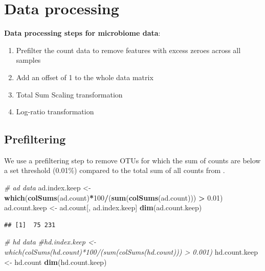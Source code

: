 \documentclass[]{book}
\newenvironment{Shaded}{\begin{snugshade}}{\end{snugshade}}
\newcommand{\KeywordTok}[1]{\textcolor[rgb]{0.13,0.29,0.53}{\textbf{#1}}}
\newcommand{\DecValTok}[1]{\textcolor[rgb]{0.00,0.00,0.81}{#1}}
\newcommand{\FloatTok}[1]{\textcolor[rgb]{0.00,0.00,0.81}{#1}}
\newcommand{\StringTok}[1]{\textcolor[rgb]{0.31,0.60,0.02}{#1}}
\newcommand{\CommentTok}[1]{\textcolor[rgb]{0.56,0.35,0.01}{\textit{#1}}}
\newcommand{\OperatorTok}[1]{\textcolor[rgb]{0.81,0.36,0.00}{\textbf{#1}}}
\newcommand{\NormalTok}[1]{#1}
\providecommand{\tightlist}{%
  \setlength{\itemsep}{0pt}\setlength{\parskip}{0pt}}
\begin{document}
\section{Data processing}\label{data-processing}

\textbf{Data processing steps for microbiome data}:

\begin{enumerate}
\def\labelenumi{\arabic{enumi}.}
\tightlist
\item
  Prefilter the count data to remove features with excess zeroes across
  all samples\\
\item
  Add an offset of 1 to the whole data matrix\\
\item
  Total Sum Scaling transformation\\
\item
  Log-ratio transformation
\end{enumerate}

\subsection{Prefiltering}\label{prefiltering}

We use a prefiltering step to remove OTUs for which the sum of counts
are below a set threshold (0.01\%) compared to the total sum of all
counts from \citep{arumugam2011enterotypes}.

\begin{Shaded}
\begin{Highlighting}[]
\CommentTok{# ad data}
\NormalTok{ad.index.keep <-}\StringTok{ }\KeywordTok{which}\NormalTok{(}\KeywordTok{colSums}\NormalTok{(ad.count)}\OperatorTok{*}\DecValTok{100}\OperatorTok{/}\NormalTok{(}\KeywordTok{sum}\NormalTok{(}\KeywordTok{colSums}\NormalTok{(ad.count))) }\OperatorTok{>}\StringTok{ }\FloatTok{0.01}\NormalTok{)}
\NormalTok{ad.count.keep <-}\StringTok{ }\NormalTok{ad.count[, ad.index.keep]}
\KeywordTok{dim}\NormalTok{(ad.count.keep)}
\end{Highlighting}
\end{Shaded}

\begin{verbatim}
## [1]  75 231
\end{verbatim}

\begin{Shaded}
\begin{Highlighting}[]
\CommentTok{# hd data}
\CommentTok{#hd.index.keep <- which(colSums(hd.count)*100/(sum(colSums(hd.count))) > 0.001)}
\NormalTok{hd.count.keep <-}\StringTok{ }\NormalTok{hd.count}
\KeywordTok{dim}\NormalTok{(hd.count.keep)}
\end{Highlighting}
\end{Shaded}
\end{document}
